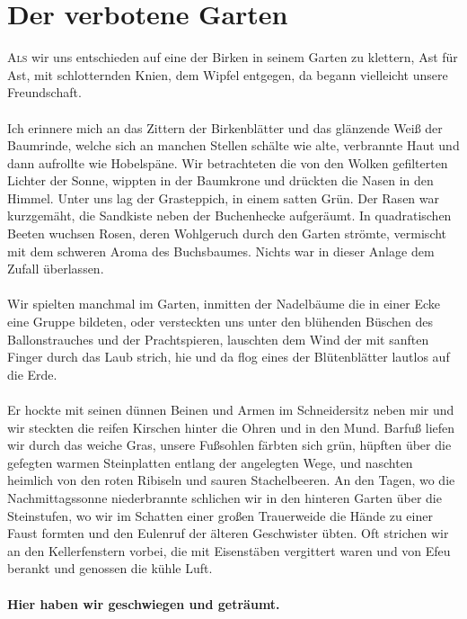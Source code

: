 \chapter{Der verbotene Garten}
\lettrine{A}{ls} wir uns entschieden auf eine der Birken in seinem Garten zu klettern, Ast für Ast, mit schlotternden Knien, dem Wipfel entgegen, da begann vielleicht unsere Freundschaft. \\\\
Ich erinnere mich an das Zittern der Birkenblätter und das glänzende Weiß der Baumrinde, welche sich an manchen Stellen schälte wie alte, verbrannte Haut und dann aufrollte wie Hobelspäne. Wir betrachteten die von den Wolken gefilterten Lichter der Sonne, wippten in der Baumkrone und drückten die Nasen in den Himmel. Unter uns lag der Grasteppich, in einem satten Grün. Der Rasen war kurzgemäht, die Sandkiste neben der Buchenhecke aufgeräumt. In quadratischen Beeten wuchsen Rosen, deren Wohlgeruch durch den Garten strömte, vermischt mit dem schweren Aroma des Buchsbaumes. Nichts war in dieser Anlage dem Zufall überlassen. \\\\
Wir spielten manchmal im Garten, inmitten der Nadelbäume die in einer Ecke eine Gruppe bildeten, oder versteckten uns unter den blühenden Büschen des Ballonstrauches und der Prachtspieren, lauschten dem Wind der mit sanften Finger durch das Laub strich, hie und da flog eines der Blütenblätter lautlos auf die Erde.\\\\
Er hockte mit seinen dünnen Beinen und Armen im Schneidersitz neben mir und wir steckten die reifen Kirschen hinter die Ohren und in den Mund. Barfuß liefen wir durch das weiche Gras, unsere Fußsohlen färbten sich grün, hüpften über die gefegten warmen Steinplatten entlang der angelegten Wege, und naschten heimlich von den roten Ribiseln und sauren Stachelbeeren. An den Tagen, wo die Nachmittagssonne niederbrannte schlichen wir in den hinteren Garten über die Steinstufen, wo wir im Schatten einer großen Trauerweide die Hände zu einer Faust formten und den Eulenruf der älteren Geschwister übten. Oft strichen wir an den Kellerfenstern vorbei, die mit Eisenstäben vergittert waren und von Efeu berankt und genossen die kühle Luft. \\\\
\textbf{Hier haben wir geschwiegen und geträumt.}\\\\
